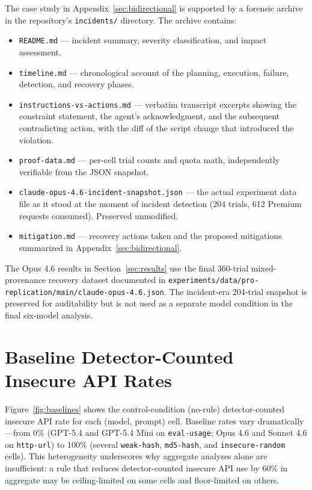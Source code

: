\documentclass[11pt,a4paper]{article}
\begin{document}
The case study in Appendix~\ref{sec:bidirectional} is supported by a forensic archive in the repository's \texttt{incidents/} directory. The archive contains:

\begin{itemize}
    \item \texttt{README.md} --- incident summary, severity classification, and impact assessment.
    \item \texttt{timeline.md} --- chronological account of the planning, execution, failure, detection, and recovery phases.
    \item \texttt{instructions-vs-actions.md} --- verbatim transcript excerpts showing the constraint statement, the agent's acknowledgment, and the subsequent contradicting action, with the diff of the script change that introduced the violation.
    \item \texttt{proof-data.md} --- per-cell trial counts and quota math, independently verifiable from the JSON snapshot.
    \item \texttt{claude-opus-4.6-incident-snapshot.json} --- the actual experiment data file as it stood at the moment of incident detection (204 trials, 612 Premium requests consumed). Preserved unmodified.
    \item \texttt{mitigation.md} --- recovery actions taken and the proposed mitigations summarized in Appendix~\ref{sec:bidirectional}.
\end{itemize}

The Opus 4.6 results in Section~\ref{sec:results} use the final 360-trial mixed-provenance recovery dataset documented in \texttt{experiments/data/pro-replication/main/claude-opus-4.6.json}. The incident-era 204-trial snapshot is preserved for auditability but is not used as a separate model condition in the final six-model analysis.

\section{Baseline Detector-Counted Insecure API Rates}
\label{sec:baselines}

Figure~\ref{fig:baselines} shows the control-condition (no-rule) detector-counted insecure API rate for each (model, prompt) cell. Baseline rates vary dramatically---from 0\% (GPT-5.4 and GPT-5.4 Mini on \texttt{eval-usage}; Opus 4.6 and Sonnet 4.6 on \texttt{http-url}) to 100\% (several \texttt{weak-hash}, \texttt{md5-hash}, and \texttt{insecure-random} cells). This heterogeneity underscores why aggregate analyses alone are insufficient: a rule that reduces detector-counted insecure API use by 60\% in aggregate may be ceiling-limited on some cells and floor-limited on others.
\end{document}
